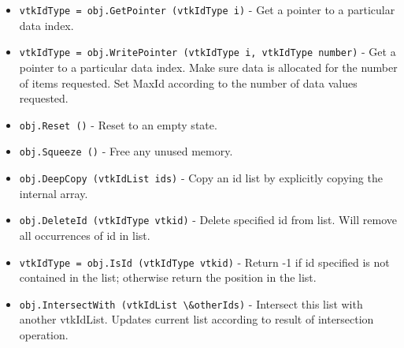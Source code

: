 \begin{itemize}
\item  \verb|vtkIdType = obj.GetPointer (vtkIdType i)| -  Get a pointer to a particular data index.

\item  \verb|vtkIdType = obj.WritePointer (vtkIdType i, vtkIdType number)| -  Get a pointer to a particular data index. Make sure data is allocated
 for the number of items requested. Set MaxId according to the number of
 data values requested.

\item  \verb|obj.Reset ()| -  Reset to an empty state.

\item  \verb|obj.Squeeze ()| -  Free any unused memory.

\item  \verb|obj.DeepCopy (vtkIdList ids)| -  Copy an id list by explicitly copying the internal array.

\item  \verb|obj.DeleteId (vtkIdType vtkid)| -  Delete specified id from list. Will remove all occurrences of id in list.

\item  \verb|vtkIdType = obj.IsId (vtkIdType vtkid)| -  Return -1 if id specified is not contained in the list; otherwise return
 the position in the list.

\item  \verb|obj.IntersectWith (vtkIdList \&otherIds)| -  Intersect this list with another vtkIdList. Updates current list according
 to result of intersection operation.

\end{itemize}
